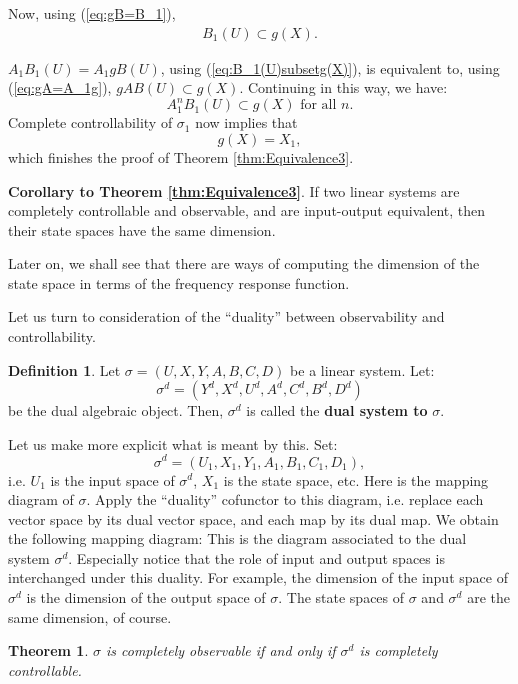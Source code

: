 \documentclass[12pt]{book}
\theoremstyle{plain}
\newtheorem{theorem}{Theorem}[section]
\theoremstyle{definition}
\newtheorem{definition}{Definition}[section]
\begin{document}
Now, using (\ref{eq:gB=B_1}),
\begin{align} \label{eq:B_1(U)subsetg(X)}
    B_1(U) \subset g(X).
\end{align}

$A_1B_1(U) = A_1gB(U)$, using (\ref{eq:B_1(U)subsetg(X)}), is equivalent to, using (\ref{eq:gA=A_1g}), $gAB(U) \subset g(X)$.
Continuing in this way, we have:
$$A_1^nB_1(U) \subset g(X) \text{ for all } n.$$
Complete controllability of $\sigma_1$ now implies that
$$g(X) = X_1,$$
which finishes the proof of Theorem \ref{thm:Equivalence3}.

\textbf{Corollary to Theorem \ref{thm:Equivalence3}}.
If two linear systems are completely controllable and observable, and are input-output equivalent, then their state spaces have the same dimension.

Later on, we shall see that there are ways of computing the dimension of the state space in terms of the frequency response function.

Let us turn to consideration of the ``duality'' between observability and controllability.

\begin{definition}
    Let $\sigma = (U, X, Y, A, B, C, D)$ be a linear system.
    Let:
    $$\sigma^d = (Y^d, X^d, U^d, A^d, C^d, B^d, D^d)$$
    be the dual algebraic object. Then, $\sigma^d$ is called the \textbf{dual system to} $\sigma$.
\end{definition}

Let us make more explicit what is meant by this.
Set:
$$\sigma^d = (U_1, X_1, Y_1, A_1, B_1, C_1, D_1),$$
i.e. $U_1$ is the input space of $\sigma^d$, $X_1$ is the state space, etc.
Here is the mapping diagram of $\sigma$.
Apply the ``duality'' cofunctor to this diagram, i.e. replace each vector space by its dual vector space, and each map by its dual map.
We obtain the following mapping diagram:
This is the diagram associated to the dual system $\sigma^d$.
Especially notice that the role of input and output spaces is interchanged under this duality.
For example, the dimension of the input space of $\sigma^d$ is the dimension of the output space of $\sigma$.
The state spaces of $\sigma$ and $\sigma^d$ are the same dimension, of course.

\begin{theorem} \label{thm:CompletelyObservableIffCompletelyControllable}
    $\sigma$ is completely observable if and only if $\sigma^d$ is completely controllable.
\end{theorem}
\end{document}
